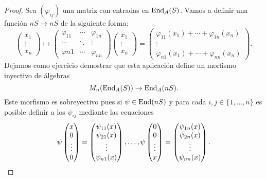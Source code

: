 \begin{proof}
	Sea $(\varphi_{ij})$ una matriz con entradas en $\operatorname{End}_A(S)$. Vamos a definir
	una función $nS\to nS$ de la siguiente forma:
	\[
	\begin{pmatrix}
	x_1\\
	\vdots\\
	x_n	
	\end{pmatrix}
	\mapsto 
		\begin{pmatrix}
			\varphi_{11} & \cdots & \varphi_{1n}\\
			\cdots & \ddots & \vdots\\
			\varphi{n1} & \cdots & \varphi_{nn}
		\end{pmatrix}
		\begin{pmatrix}
		x_1\\
		\vdots\\
		x_n	
		\end{pmatrix}
		=\begin{pmatrix}
			\varphi_{11}(x_1)+\cdots+\varphi_{1n}(x_n)\\
			\vdots\\
			\varphi_{n1}(x_1)+\cdots+\varphi_{nn}(x_n)
		\end{pmatrix}.
	\]
	Dejamos como ejercicio demostrar que esta aplicación define un morfismo inyectivo 
	de álgebras
	\[
		M_n(\operatorname{End}_A(S))\to\operatorname{End}_A(nS).
	\]
	Este morfismo es sobreyectivo pues si $\psi\in\operatorname{End}(nS)$ y para cada
	$i,j\in\{1,\dots,n\}$ es posible definir a los $\psi_{ij}$ mediante las ecuaciones
	\[
		\psi\begin{pmatrix}
		x\\
		0\\
		\vdots\\
		0	
		\end{pmatrix}
		=\begin{pmatrix}
		\psi_{11}(x)\\
		\psi_{21}(x)\\
		\vdots\\
		\psi_{n1}(x)
		\end{pmatrix},\dots,
		\psi\begin{pmatrix}
		0\\
		0\\
		\vdots\\
		x	
		\end{pmatrix}
		=\begin{pmatrix}
		\psi_{1n}(x)\\
		\psi_{2n}(x)\\
		\vdots\\
		\psi_{nn}(x)
		\end{pmatrix}.\qedhere
	\]
\end{proof}

